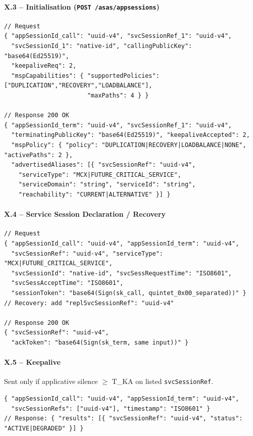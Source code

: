 \documentclass[11pt,a4paper]{article}
\newcommand{\svcref}{\texttt{svcSessionRef}}
\begin{document}
\paragraph{X.3 -- Initialisation (\texttt{POST /asas/appsessions})}
\label{x3}
\begin{lstlisting}[language={}]
// Request
{ "appSessionId_call": "uuid-v4", "svcSessionRef_1": "uuid-v4",
  "svcSessionId_1": "native-id", "callingPublicKey": "base64(Ed25519)",
  "keepaliveReq": 2,
  "mspCapabilities": { "supportedPolicies": ["DUPLICATION","RECOVERY","LOADBALANCE"],
                       "maxPaths": 4 } }

// Response 200 OK
{ "appSessionId_term": "uuid-v4", "svcSessionRef_1": "uuid-v4",
  "terminatingPublicKey": "base64(Ed25519)", "keepaliveAccepted": 2,
  "mspPolicy": { "policy": "DUPLICATION|RECOVERY|LOADBALANCE|NONE", "activePaths": 2 },
  "advertisedAliases": [{ "svcSessionRef": "uuid-v4",
    "serviceType": "MCX|FUTURE_CRITICAL_SERVICE",
    "serviceDomain": "string", "serviceId": "string",
    "reachability": "CURRENT|ALTERNATIVE" }] }
\end{lstlisting}

\paragraph{X.4 -- Service Session Declaration / Recovery}
\label{x4}
\begin{lstlisting}[language={}]
// Request
{ "appSessionId_call": "uuid-v4", "appSessionId_term": "uuid-v4",
  "svcSessionRef": "uuid-v4", "serviceType": "MCX|FUTURE_CRITICAL_SERVICE",
  "svcSessionId": "native-id", "svcSessRequestTime": "ISO8601",
  "svcSessAcceptTime": "ISO8601",
  "sessionToken": "base64(Sign(sk_call, quintet_0x00_separated))" }
// Recovery: add "replSvcSessionRef": "uuid-v4"

// Response 200 OK
{ "svcSessionRef": "uuid-v4",
  "ackToken": "base64(Sign(sk_term, same input))" }
\end{lstlisting}

\paragraph{X.5 -- Keepalive}
\label{x5}
Sent only if applicative silence $\geq$ T\_KA on listed \svcref.

\begin{lstlisting}[language={}]
{ "appSessionId_call": "uuid-v4", "appSessionId_term": "uuid-v4",
  "svcSessionRefs": ["uuid-v4"], "timestamp": "ISO8601" }
// Response: { "results": [{ "svcSessionRef": "uuid-v4", "status": "ACTIVE|DEGRADED" }] }
\end{lstlisting}
\end{document}
